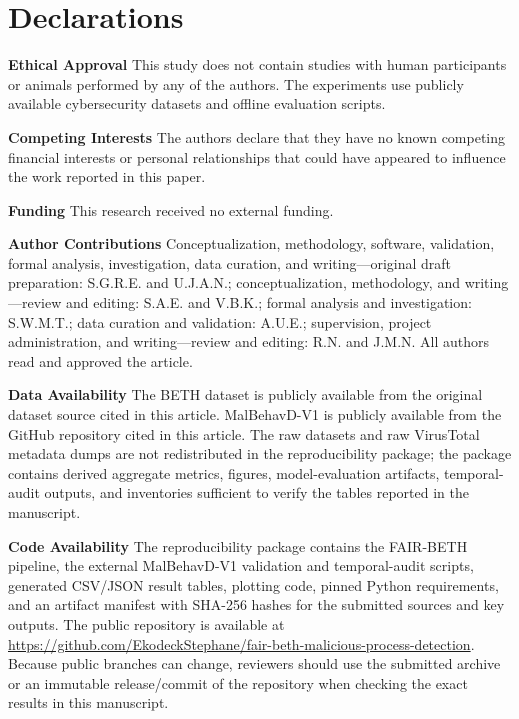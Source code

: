 \documentclass[10pt,journal,compsoc]{IEEEtran}
\begin{document}
\section*{Declarations}
\begin{sloppypar}
\noindent\textbf{Ethical Approval} This study does not contain studies with human participants or animals performed by any of the authors. The experiments use publicly available cybersecurity datasets and offline evaluation scripts.
\end{sloppypar}

\noindent
\begin{sloppypar}
\textbf{Competing Interests} The authors declare that they have no known competing financial interests or personal relationships that could have appeared to influence the work reported in this paper.
\end{sloppypar}

\noindent
\begin{sloppypar}
\textbf{Funding} This research received no external funding.
\end{sloppypar}

\noindent
\begin{sloppypar}
\textbf{Author Contributions} Conceptualization, methodology, software, validation, formal analysis, investigation, data curation, and writing---original draft preparation: S.G.R.E. and U.J.A.N.; conceptualization, methodology, and writing---review and editing: S.A.E. and V.B.K.; formal analysis and investigation: S.W.M.T.; data curation and validation: A.U.E.; supervision, project administration, and writing---review and editing: R.N. and J.M.N. All authors read and approved the article.
\end{sloppypar}

\noindent
\begin{sloppypar}
\textbf{Data Availability} The BETH dataset is publicly available from the original dataset source cited in this article. MalBehavD-V1 is publicly available from the GitHub repository cited in this article. The raw datasets and raw VirusTotal metadata dumps are not redistributed in the reproducibility package; the package contains derived aggregate metrics, figures, model-evaluation artifacts, temporal-audit outputs, and inventories sufficient to verify the tables reported in the manuscript.
\end{sloppypar}

\noindent
\begin{sloppypar}
\textbf{Code Availability} The reproducibility package contains the FAIR-BETH pipeline, the external MalBehavD-V1 validation and temporal-audit scripts, generated CSV/JSON result tables, plotting code, pinned Python requirements, and an artifact manifest with SHA-256 hashes for the submitted sources and key outputs. The public repository is available at \url{https://github.com/EkodeckStephane/fair-beth-malicious-process-detection}. Because public branches can change, reviewers should use the submitted archive or an immutable release/commit of the repository when checking the exact results in this manuscript.
\end{sloppypar}



\end{document}
